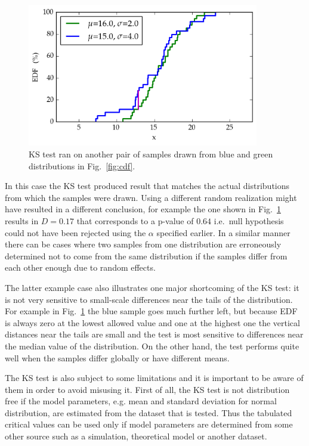 \documentclass[english, oneside]{HYgradu}
\begin{document}
\begin{figure}
   \centering
   \includegraphics[width=0.9\textwidth]{kuvat/kstest-error.png}
   \caption{KS test ran on another pair of samples drawn from blue and green distributions in Fig.\ \ref{fig:cdf}.}
   \label{fig:ks-error} 
\end{figure}

In this case the KS test produced result that matches the actual distributions from which the samples were drawn. Using a different random realization might have resulted in a different conclusion, for example the one shown in Fig.\ \ref{fig:ks-error} results in $D=0.17$ that corresponds to a p-value of $0.64$ i.e.\ null hypothesis could not have been rejected using the $\alpha$ specified earlier. In a similar manner there can be cases where two samples from one distribution are erroneously determined not to come from the same distribution if the samples differ from each other enough due to random effects.

The latter example case also illustrates one major shortcoming of the KS test: it is not very sensitive to small-scale differences near the tails of the distribution. For example in Fig.\ \ref{fig:ks-error} the blue sample goes much further left, but because EDF is always zero at the lowest allowed value and one at the highest one the vertical distances near the tails are small and the test is most sensitive to differences near the median value of the distribution. On the other hand, the test performs quite well when the samples differ globally or have different means. \citep{feigelson2012modern}

The KS test is also subject to some limitations and it is important to be aware of them in order to avoid misusing it. First of all, the KS test is not distribution free if the model parameters, e.g. mean and standard deviation for normal distribution, are estimated from the dataset that is tested. Thus the tabulated critical values can be used only if model parameters are determined from some other source such as a simulation, theoretical model or another dataset.
\end{document}
